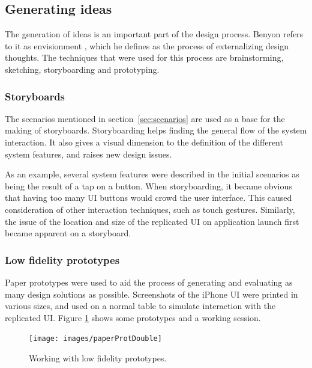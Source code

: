 \subsection{Generating ideas}

The generation of ideas is an important part of the design process.
Benyon refers to it as envisionment \citep{Benyon:2010}, which he defines as the process of externalizing design thoughts.
The techniques that were used for this process are brainstorming, sketching, storyboarding and prototyping.

\subsubsection{Storyboards}

The scenarios mentioned in section~\ref{sec:scenarios} are used as a base for the making of storyboards.
Storyboarding helps finding the general flow of the system interaction.
It also gives a visual dimension to the definition of the different system features, and raises new design issues.

As an example, several system features were described in the initial scenarios as being the result of a tap on a button.
When storyboarding, it became obvious that having too many UI buttons would crowd the user interface.
This caused consideration of other interaction techniques, such as touch gestures.
Similarly, the issue of the location and size of the replicated UI on application launch first became apparent on a storyboard.

\subsubsection{Low fidelity prototypes}

Paper prototypes were used to aid the process of generating and evaluating as many design solutions as possible.
Screenshots of the iPhone UI \citep{iphone} were printed in various sizes, and used on a normal table to simulate interaction with the replicated UI.
Figure \ref{paperProt} shows some prototypes and a working session.

\begin{figure}[htb]
  \centering
    \texttt{[image: images/paperProtDouble]}
  \caption{Working with low fidelity prototypes.}
  \label{paperProt}
\end{figure}


